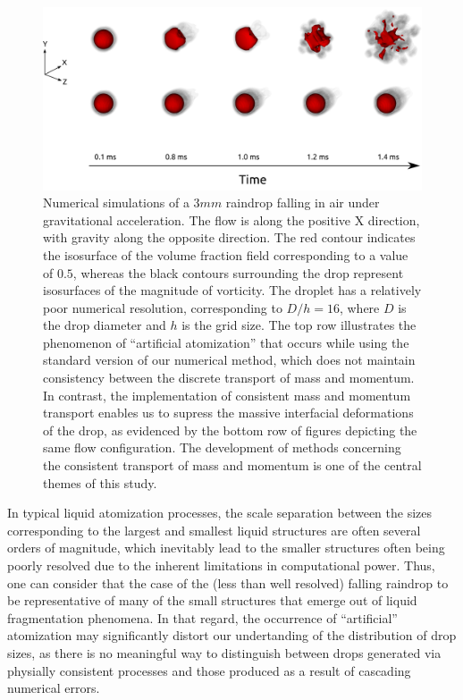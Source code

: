 \begin{figure}
\begin{center}
\includegraphics{plots/raindrop/raindrop_explode.png}
\end{center}
\caption{Numerical simulations of a $3 mm$ raindrop falling in air under gravitational acceleration.
	The flow is along the positive X direction, with gravity along the opposite direction. 
	The red contour indicates the isosurface of the volume fraction 
	field corresponding to a value of $0.5$, whereas the black contours 
	surrounding the drop represent isosurfaces of the magnitude of vorticity.
	The droplet has a relatively poor numerical resolution, corresponding to $D/h = 16$,
	where $D$ is the drop diameter and $h$ is the grid size.
	The top row illustrates the phenomenon of ``artificial atomization'' that occurs
	while using the standard version of our numerical method, which does not maintain
	consistency between the discrete transport of mass and momentum.
	In contrast, the implementation of consistent mass and momentum transport
	enables us to supress the massive interfacial deformations of the drop, 
	as evidenced by the bottom row of figures depicting the same flow configuration. 
	The development of methods concerning the consistent transport of mass and momentum 
	is one of the central themes of this study.
	}
	\label{explode_compare}
\end{figure}

In typical liquid atomization processes, the scale separation
between the sizes corresponding to the largest and smallest liquid structures 
are often several orders of magnitude, which inevitably lead to the smaller 
structures often being poorly resolved due to the inherent limitations in computational power. 
Thus, one can consider that the case of the (less than well resolved) falling raindrop to be 
representative of many of the small structures that emerge out of liquid fragmentation phenomena. 
In that regard, the occurrence of ``artificial'' atomization may significantly distort 
our undertanding of the distribution of drop sizes, as there is no meaningful way 
to distinguish between drops generated via physially consistent processes and 
those produced as a result of cascading numerical errors. 



